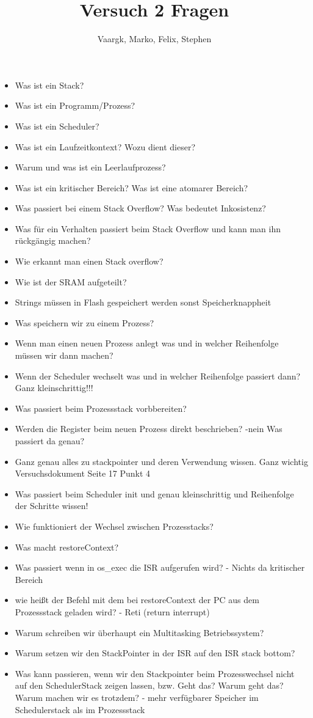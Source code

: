 \documentclass[12pt]{article}
\title{Versuch 2 Fragen}
\author{
        Vaargk, Marko, Felix, Stephen

}
\begin{document}
\maketitle

\begin{itemize}
\item Was ist ein Stack?
\item Was ist ein Programm/Prozess?
\item Was ist ein Scheduler?
\item Was ist ein Laufzeitkontext? Wozu dient dieser?
\item Warum und was ist ein Leerlaufprozess?
\item Was ist ein kritischer Bereich? Was ist eine atomarer Bereich?
\item Was passiert bei einem Stack Overflow? Was bedeutet Inkosistenz?
\item Was für ein Verhalten passiert beim Stack Overflow und kann man ihn rückgängig machen?
\item Wie erkannt man einen Stack overflow?
\item Wie ist der SRAM aufgeteilt?
\item Strings müssen in Flash gespeichert werden sonst Speicherknappheit
\item Was speichern wir zu einem Prozess?
\item Wenn man einen neuen Prozess anlegt was und in welcher Reihenfolge müssen wir dann machen?
\item Wenn der Scheduler wechselt was und in welcher Reihenfolge passiert dann? Ganz kleinschrittig!!!
\item Was passiert beim Prozessstack vorbbereiten?
\item Werden die Register beim neuen Prozess direkt beschrieben? -nein Was passiert da genau?
\item Ganz genau alles zu stackpointer und deren Verwendung wissen. Ganz wichtig Versuchsdokument Seite 17 Punkt 4
\item Was passiert beim Scheduler init und genau kleinschrittig und Reihenfolge der Schritte wissen!
\item Wie funktioniert der Wechsel zwischen Prozesstacks?
\item Was macht restoreContext?
\item Was passiert wenn in os_exec die ISR aufgerufen wird? - Nichts da kritischer Bereich
\item wie heißt der Befehl mit dem bei restoreContext der PC aus dem Prozessstack geladen wird? - Reti (return interrupt)
\item Warum schreiben wir überhaupt ein Multitasking Betriebssystem?
\item Warum setzen wir den StackPointer in der ISR auf den ISR stack bottom?
\item Was kann passieren, wenn wir den Stackpointer beim Prozesswechsel nicht auf den SchedulerStack zeigen lassen, bzw. Geht das? Warum geht das? Warum machen wir es trotzdem? - mehr verfügbarer Speicher im Schedulerstack als im Prozessstack
\end{itemize}
\end{document}
